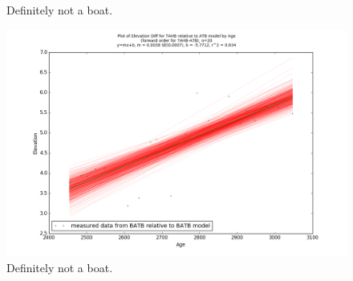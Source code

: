 \begin{figure}[h]
	\caption{Definitely not a boat.}
	\label{fig:data_TAHBxATB}
\end{figure}
\newpage

\begin{figure}[h]
	\includegraphics[width=\linewidth]{data/gias/theGIA_TAHB_relative_to_ATB.png}
	\caption{Definitely not a boat.}
	\label{fig:gias_TAHBxATB}
\end{figure}
\newpage


